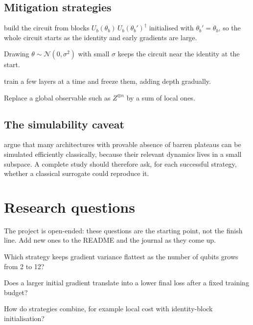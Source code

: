 \documentclass[11pt,a4paper]{article}
\begin{document}
\subsection{Mitigation strategies}
\begin{description}[style=nextline,leftmargin=1.2em]
  \item[Identity-block initialisation] \citet{grant2019} build the circuit from blocks
        $U_b(\theta_b)\,U_b(\theta_b')^\dagger$ initialised with $\theta_b'=\theta_b$, so the whole circuit
        starts as the identity and early gradients are large.
  \item[Small-angle initialisation] Drawing $\theta\sim\mathcal N(0,\sigma^2)$ with small $\sigma$ keeps the
        circuit near the identity at the start.
  \item[Layerwise learning] \citet{skolik2021} train a few layers at a time and freeze them, adding depth
        gradually.
  \item[Local costs] Replace a global observable such as $Z^{\otimes n}$ by a sum of local ones.
\end{description}

\subsection{The simulability caveat}
\citet{cerezo2023simulability} argue that many architectures with provable absence of barren plateaus
can be simulated efficiently classically, because their relevant dynamics lives in a small subspace. A
complete study should therefore ask, for each successful strategy, whether a classical surrogate could
reproduce it.

\section{Research questions}
The project is open-ended: these questions are the starting point, not the finish line. Add new
ones to the README and the journal as they come up.

\begin{rqlist}
  \item Which strategy keeps gradient variance flattest as the number of qubits grows from 2 to 12?
  \item Does a larger initial gradient translate into a lower final loss after a fixed training budget?
  \item How do strategies combine, for example local cost with identity-block initialisation?
\end{rqlist}
\end{document}
